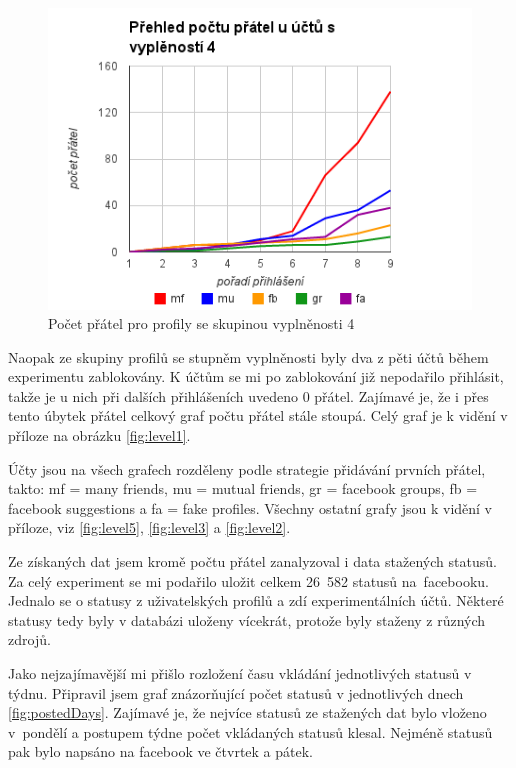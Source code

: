 \documentclass[thesis=M,czech]{FITthesis}[2013/05/10]
\begin{document}
\begin{figure}[h]
\begin{center}
\includegraphics[width=5in]{figures/level4.png}
\caption{Počet přátel pro profily se skupinou vyplněnosti 4}
\label{fig:level4}
\end{center}
\end{figure}

Naopak ze skupiny profilů se stupněm vyplněnosti byly dva z pěti účtů během experimentu zablokovány. K účtům se mi po zablokování již nepodařilo přihlásit, takže je u nich při dalších přihlášeních uvedeno 0 přátel. Zajímavé je, že i přes tento úbytek přátel celkový graf počtu přátel stále stoupá. Celý graf je k vidění v příloze na obrázku \ref{fig:level1}.

Účty jsou na všech grafech rozděleny podle strategie přidávání prvních přátel, takto: mf = many friends, mu = mutual friends, gr = facebook groups, fb = facebook suggestions a fa = fake profiles. Všechny ostatní grafy jsou k vidění v příloze, viz \ref{fig:level5}, \ref{fig:level3} a \ref{fig:level2}.


Ze získaných dat jsem kromě počtu přátel zanalyzoval i data stažených statusů. Za celý experiment se mi podařilo uložit celkem 26~582 statusů na~facebooku. Jednalo se o statusy z uživatelských profilů a zdí experimentálních účtů. Některé statusy tedy byly v databázi uloženy vícekrát, protože byly staženy z různých zdrojů.

Jako nejzajímavější mi přišlo rozložení času vkládání jednotlivých statusů v týdnu. Připravil jsem graf znázorňující počet statusů v jednotlivých dnech \ref{fig:postedDays}. Zajímavé je, že nejvíce statusů ze stažených dat bylo vloženo v~pondělí a postupem týdne počet vkládaných statusů klesal. Nejméně statusů pak bylo napsáno na facebook ve čtvrtek a pátek.
\end{document}
